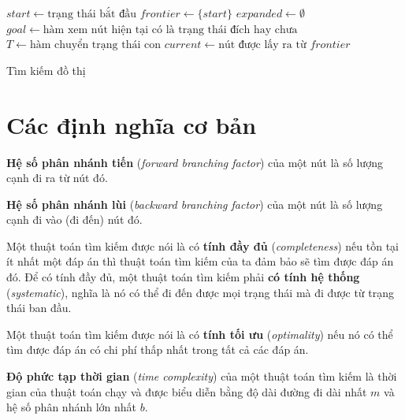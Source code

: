 \begin{algorithm}[H]
  $start \gets \text{trạng thái bắt đầu}$\;
  $frontier \gets \{start\}$\;
  $expanded \gets \emptyset$\;
  $goal \gets \text{hàm xem nút hiện tại có là trạng thái đích hay chưa}$\;
  $T \gets \text{hàm chuyển trạng thái con}$\;
  {
      $current \gets \text{nút được lấy ra từ $frontier$}$\;
      \;
      {
        \;
      }{
        {
            {
                \;
            }
        }
      }
  }
  \;
  \caption{Tìm kiếm đồ thị}
  \label{algo:1}
\end{algorithm}

\section{Các định nghĩa cơ bản}

\begin{defivn} \textbf{Hệ số phân nhánh tiến} (\textit{forward branching factor}) của một nút là số lượng cạnh đi ra từ nút đó.
\end{defivn}

\begin{defivn} \textbf{Hệ số phân nhánh lùi} (\textit{backward branching factor}) của một nút là số lượng cạnh đi vào (đi đến) nút đó.
\end{defivn}

\begin{defivn} Một thuật toán tìm kiếm được nói là có \textbf{tính đầy đủ} (\textit{completeness}) nếu tồn tại ít nhất một đáp án thì thuật toán tìm kiếm của ta đảm bảo sẽ tìm được đáp án đó. Để có tính đầy đủ, một thuật toán tìm kiếm phải \textbf{có tính hệ thống} (\textit{systematic}), nghĩa là nó có thể đi đến được mọi trạng thái mà đi được từ trạng thái ban đầu.
\end{defivn}

\begin{defivn} Một thuật toán tìm kiếm được nói là có \textbf{tính tối ưu} (\textit{optimality}) nếu nó có thể tìm được đáp án có chi phí thấp nhất trong tất cả các đáp án.
\end{defivn}

\begin{defivn} \textbf{Độ phức tạp thời gian} (\textit{time complexity}) của một thuật toán tìm kiếm là thời gian của thuật toán chạy và được biểu diễn bằng độ dài đường đi dài nhất $m$ và hệ số phân nhánh lớn nhất $b$.
\end{defivn}

